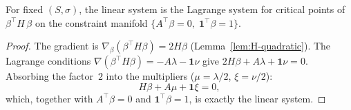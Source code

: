 \begin{notationupdated}
\begin{lemma}%
\label{lem:kkt}
For fixed $(S, \sigma)$, the linear
system is the Lagrange system for
critical points of
$\beta^\top H\, \beta$ on the constraint
manifold
$\{A^\top \beta = 0,\; \mathbf{1}^\top \beta = 1\}$.
\end{lemma}

\begin{proof}
The gradient is
$\nabla_{\beta}
  (\beta^\top H \beta) = 2H \beta$
(Lemma~\ref{lem:H-quadratic}).
The Lagrange conditions
$\nabla(\beta^\top H \beta)
= -A\lambda - \mathbf{1}\nu$
give
$2H\beta + A\lambda + \mathbf{1}\nu = 0$.
Absorbing the factor~$2$ into the multipliers
($\mu = \lambda/2$, $\xi = \nu/2$):
\[
  H \beta + A \mu + \mathbf{1} \xi = 0,
\]
which, together with $A^\top \beta = 0$ and
$\mathbf{1}^\top \beta = 1$, is exactly
the linear system.
\end{proof}
\end{notationupdated}


